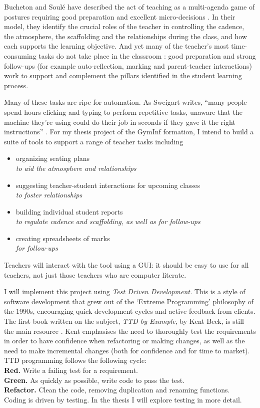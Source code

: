\documentclass[10pt]{article}
\begin{document}
Bucheton and Soulé have described the act of teaching as a multi-agenda game of postures requiring good preparation and excellent micro-decisions \cite{BS09}. In their model, they identify the crucial roles of the teacher in controlling the cadence, the atmosphere, the scaffolding and the relationships during the class, and how each supports the learning objective. And yet many of the teacher's most time-consuming tasks do not take place in the classroom \cite{Bryant20}: good preparation and strong follow-ups (for example auto-reflection, marking and parent-teacher interactions) work to support and complement the pillars identified in the student learning process.

Many of these tasks are ripe for automation. As Sweigart writes, ``many people spend hours clicking and typing to perform repetitive tasks, unaware that the machine they’re using could do their job in seconds if they gave it the right instructions'' \cite{Swei15}.  For my thesis project of the GymInf formation, I intend to build a suite of tools to support a range of teacher tasks including 
\begin{itemize} 
\item organizing seating plans \\
\emph{to aid the atmosphere and relationships} 
\item suggesting teacher-student interactions for upcoming classes \\
\emph{to foster relationships}
\item building individual student reports \\
\emph{to regulate cadence and scaffolding, as well as for follow-ups}
\item creating spreadsheets of marks \\
\emph{for follow-ups}
\end{itemize}
Teachers will interact with the tool using a GUI: it should be easy to use for all teachers, not just those teachers who are computer literate.


I will implement this project using \emph{Test Driven Development.} This is a style of software development that grew out of the `Extreme Programming' philosophy of the 1990s, encouraging quick development cycles and active feedback from clients. The first book written on the subject, \emph{TTD by Example}, by Kent Beck, is still the main resource \cite{Beck03}. Kent emphasises the need to thoroughly test the requirements in order to have confidence when refactoring or making changes, as well as the need to make incremental changes (both for confidence and for time to market). TTD programming follows the following cycle: \\
\indent \textbf{Red.} Write a failing test for a requirement. \\
\indent \textbf{Green.} As quickly as possible, write code to pass the test. \\
\indent \textbf{Refactor.} Clean the code, removing duplication and renaming functions. \\
Coding is driven by testing. In the thesis I will explore testing in more detail.
\end{document}

